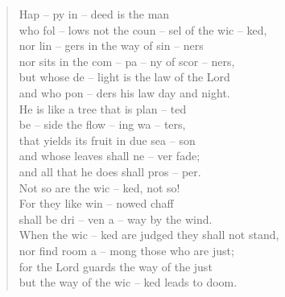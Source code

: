\documentclass[10pt,a5paper,twoside]{report}
\begin{document}
\begin{flushleft}
\begin{verse}
 Hap -- py in -- deed is the man\\
who fol -- lows not the coun -- sel of the wic -- ked,\\
nor lin -- gers in the way of sin -- ners\\
nor sits in the com -- pa -- ny of scor -- ners,\\
 but whose de -- light is the law of the Lord\\
and who pon -- ders his law day and night.\\

 He is like a tree that is plan -- ted\\
be -- side the flow -- ing wa -- ters,\\
that yields its fruit in due sea -- son\\
and whose leaves shall ne -- ver fade;\\
and all that he does shall pros -- per.\\
 Not so are the wic -- ked, not so!\\

For they like win -- nowed chaff\\
shall be dri -- ven a -- way by the wind.\\
 When the wic -- ked are judged they shall not stand,\\
nor find room a -- mong those who are just;\\
 for the Lord guards the way of the just\\
but the way of the wic -- ked leads to doom.\\

\end{verse}
\end{flushleft}
\end{document}
